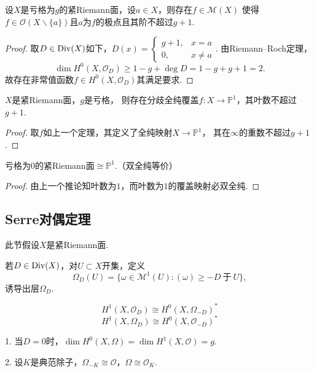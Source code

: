 \begin{theorem}
	设$X$是亏格为$g$的紧Riemann面，设$a\in X$，则存在$f\in \mathscr{M}(X)$
    使得$f\in \mathcal{O}(X\backslash \{a\})$且$a$为$f$的极点且其阶不超过$g+1$.
\end{theorem}

\begin{proof}
	取$D\in \operatorname{Div}(X)$如下，$D(x)=\begin{cases} g+1, &x=a\\ 0, &x\neq a\end{cases}$. 
    由Riemann--Roch定理，
	$$\dim H^0(X, \mathcal{O}_D)\geq 1-g +\deg D=1-g+g+1=2.$$
	故存在非常值函数$f\in H^0(X, \mathcal{O}_D)$其满足要求.
\end{proof}

\begin{corollary}
	$X$是紧Riemann面，$g$是亏格，
    则存在分歧全纯覆盖$f\colon X\rightarrow \mathbb{P}^1$，其叶数不超过$g+1$.
\end{corollary}

\begin{proof}
	取$f$如上一个定理，其定义了全纯映射$X\rightarrow \mathbb{P}^1$，
    其在$\infty$的重数不超过$g+1$.
\end{proof}

\begin{corollary}
	亏格为$0$的紧Riemann面$\cong \mathbb{P}^1$.（双全纯等价）
\end{corollary}

\begin{proof}
	由上一个推论知叶数为$1$，而叶数为$1$的覆盖映射必双全纯.
\end{proof}


\subsection{Serre对偶定理}
此节假设$X$是紧Riemann面.

\begin{definition}
	若$D\in \operatorname{Div}(X)$，对$U\subset X$开集，定义
	$$\Omega_D(U)=\{\omega\in \mathscr{M}^1(U): (\omega)\geq -D \ \text{于}\ U\},$$
    诱导出层$\Omega_D$.
\end{definition}

\begin{theorem}[Serre对偶定理]
	$$H^1(X, \mathcal{O}_D)\cong H^0(X, \Omega_{-D})^*$$
	$$H^1(X, \Omega_D)\cong H^0(X, \mathcal{O}_{-D})^*$$
\end{theorem}

\begin{remark}
	1. 当$D=0$时，$\dim H^0(X, \Omega)=\dim H^1(X, \mathcal{O})=g$.
    
    2. 设$K$是典范除子，$\Omega_{-K}\cong \mathcal{O}$，$\Omega\cong \mathcal{O}_K$.
\end{remark}

